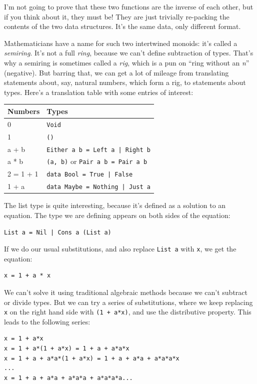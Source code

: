 I'm not going to prove that these two functions are the inverse of each
other, but if you think about it, they must be! They are just trivially
re-packing the contents of the two data structures. It's the same data,
only different format.

Mathematicians have a name for such two intertwined monoids: it's called
a \emph{semiring}. It's not a full \emph{ring}, because we can't define
subtraction of types. That's why a semiring is sometimes called a
\emph{rig}, which is a pun on ``ring without an \emph{n}'' (negative).
But barring that, we can get a lot of mileage from translating
statements about, say, natural numbers, which form a rig, to statements
about types. Here's a translation table with some entries of interest:

\begin{longtable}[]{@{}ll@{}}
\toprule
Numbers & Types\tabularnewline
\midrule
\endhead
0 & \texttt{Void}\tabularnewline
1 & \texttt{()}\tabularnewline
a + b &
\texttt{Either a b = Left a | Right b}\tabularnewline
a * b & \texttt{(a, b)} or 
\texttt{Pair a b = Pair a b}\tabularnewline
2 = 1 + 1 &
\texttt{data Bool = True | False}\tabularnewline
1 + a &
\texttt{data Maybe = Nothing | Just a}\tabularnewline
\bottomrule
\end{longtable}

\noindent
The list type is quite interesting, because it's defined as a solution
to an equation. The type we are defining appears on both sides of the
equation:

\begin{verbatim}
List a = Nil | Cons a (List a)
\end{verbatim}

\noindent
If we do our usual substitutions, and also replace \texttt{List\ a} with
\texttt{x}, we get the equation:

\begin{verbatim}
x = 1 + a * x
\end{verbatim}

\noindent
We can't solve it using traditional algebraic methods because we can't
subtract or divide types. But we can try a series of substitutions,
where we keep replacing \texttt{x} on the right hand side with
\texttt{(1 + a*x)}, and use the distributive property. This leads to
the following series:

\begin{verbatim}
x = 1 + a*x
x = 1 + a*(1 + a*x) = 1 + a + a*a*x
x = 1 + a + a*a*(1 + a*x) = 1 + a + a*a + a*a*a*x
...
x = 1 + a + a*a + a*a*a + a*a*a*a...
\end{verbatim}

